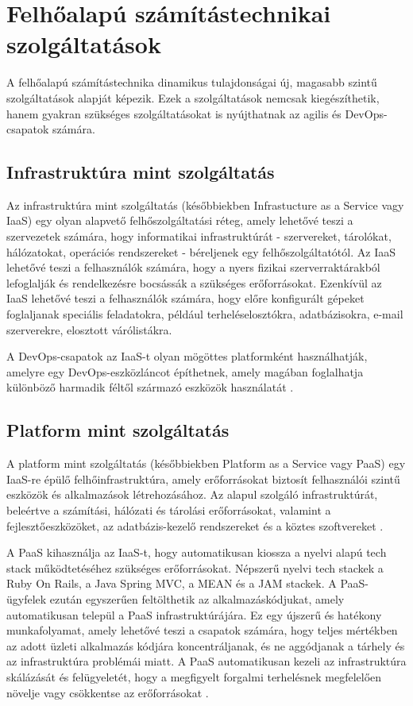 \section{Felhőalapú számítástechnikai szolgáltatások}
A felhőalapú számítástechnika dinamikus tulajdonságai új, magasabb szintű szolgáltatások alapját képezik.
Ezek a szolgáltatások nemcsak kiegészíthetik, hanem gyakran szükséges szolgáltatásokat is nyújthatnak az agilis és DevOps-csapatok számára.

\subsection{Infrastruktúra mint szolgáltatás}
Az infrastruktúra mint szolgáltatás (későbbiekben Infrastucture as a Service vagy IaaS) egy olyan alapvető felhőszolgáltatási réteg, amely lehetővé teszi a szervezetek számára, hogy informatikai infrastruktúrát - szervereket, tárolókat, hálózatokat, operációs rendszereket - béreljenek egy felhőszolgáltatótól.
Az IaaS lehetővé teszi a felhasználók számára, hogy a nyers fizikai szerverraktárakból lefoglalják és rendelkezésre bocsássák a szükséges erőforrásokat. Ezenkívül az IaaS lehetővé teszi a felhasználók számára, hogy előre konfigurált gépeket foglaljanak speciális feladatokra, például terheléselosztókra, adatbázisokra, e-mail szerverekre, elosztott várólistákra.

A DevOps-csapatok az IaaS-t olyan mögöttes platformként használhatják, amelyre egy DevOps-eszközláncot építhetnek, amely magában foglalhatja különböző harmadik féltől származó eszközök használatát \cite{cloudComp}.

\subsection{Platform mint szolgáltatás}
A platform mint szolgáltatás (későbbiekben Platform as a Service vagy PaaS) egy IaaS-re épülő felhőinfrastruktúra, amely erőforrásokat biztosít felhasználói szintű eszközök és alkalmazások létrehozásához.
Az alapul szolgáló infrastruktúrát, beleértve a számítási, hálózati és tárolási erőforrásokat, valamint a fejlesztőeszközöket, az adatbázis-kezelő rendszereket és a köztes szoftvereket \cite{cloudComp}.

A PaaS kihasználja az IaaS-t, hogy automatikusan kiossza a nyelvi alapú tech stack működtetéséhez szükséges erőforrásokat.
Népszerű nyelvi tech stackek a Ruby On Rails, a Java Spring MVC, a MEAN és a JAM stackek. A PaaS-ügyfelek ezután egyszerűen feltölthetik az alkalmazáskódjukat, amely automatikusan települ a PaaS infrastruktúrájára.
Ez egy újszerű és hatékony munkafolyamat, amely lehetővé teszi a csapatok számára, hogy teljes mértékben az adott üzleti alkalmazás kódjára koncentráljanak, és ne aggódjanak a tárhely és az infrastruktúra problémái miatt.
A PaaS automatikusan kezeli az infrastruktúra skálázását és felügyeletét, hogy a megfigyelt forgalmi terhelésnek megfelelően növelje vagy csökkentse az erőforrásokat \cite{cloudComp}.

